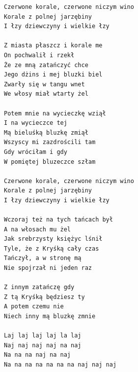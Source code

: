 \documentclass[12pt]{article}
\begin{document}
\begin{verbatim}
Czerwone korale, czerwone niczym wino
Korale z polnej jarzębiny
I łzy dziewczyny i wielkie łzy

Z miasta płaszcz i korale me
On pochwalił i rzekł
Że ze mną zatańczyć chce
Jego dżins i mej bluzki biel
Zwarły się w tangu wnet
We włosy miał wtarty żel

Potem mnie na wycieczkę wziął
I na wycieczce tej
Mą bieluśką bluzkę zmiął
Wszyscy mi zazdrościli tam
Gdy wróciłam i gdy
W pomiętej bluzeczce szłam

Czerwone korale, czerwone niczym wino
Korale z polnej jarzębiny
I łzy dziewczyny i wielkie łzy

Wczoraj też na tych tańcach był
A na włosach mu żel
Jak srebrzysty księżyc lśnił
Tyle, że z Kryśką cały czas
Tańczył, a w stronę mą
Nie spojrzał ni jeden raz

Z innym zatańczę gdy
Z tą Kryśką będziesz ty
A potem czemu nie
Niech inny mą bluzkę zmnie

Laj laj laj laj la laj
Naj naj naj naj na naj
Na na na naj na naj
Na na na na na na na naj naj naj
\end{verbatim}
\clearpage
\end{document}

